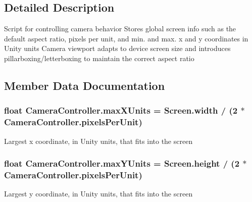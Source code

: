 \subsection{Detailed Description}
Script for controlling camera behavior Stores global screen info such as the default aspect ratio, pixels per unit, and min. and max. x and y coordinates in Unity units Camera viewport adapts to device screen size and introduces pillarboxing/letterboxing to maintain the correct aspect ratio 



\subsection{Member Data Documentation}
\subsubsection[{\texorpdfstring{max\+X\+Units}{maxXUnits}}]{\setlength{\rightskip}{0pt plus 5cm}float Camera\+Controller.\+max\+X\+Units = Screen.\+width / (2 $\ast$ {\bf Camera\+Controller.\+pixels\+Per\+Unit})\hspace{0.3cm}{\ttfamily [static]}}\hypertarget{class_camera_controller_a42b69f34a276c249820bafba804521b8}{}\label{class_camera_controller_a42b69f34a276c249820bafba804521b8}


Largest x coordinate, in Unity units, that fits into the screen 

\subsubsection[{\texorpdfstring{max\+Y\+Units}{maxYUnits}}]{\setlength{\rightskip}{0pt plus 5cm}float Camera\+Controller.\+max\+Y\+Units = Screen.\+height / (2 $\ast$ {\bf Camera\+Controller.\+pixels\+Per\+Unit})\hspace{0.3cm}{\ttfamily [static]}}\hypertarget{class_camera_controller_a85a5eec75550876c672aa0f67838ffad}{}\label{class_camera_controller_a85a5eec75550876c672aa0f67838ffad}


Largest y coordinate, in Unity units, that fits into the screen 

